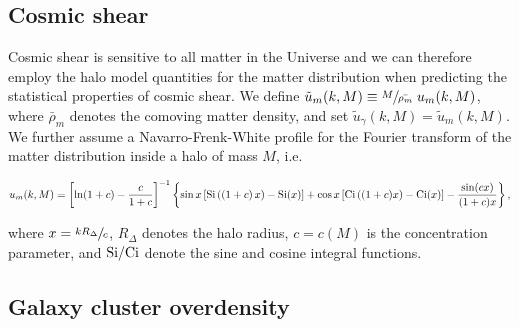 \documentclass[%
 reprint,
nofootinbib,
 amsmath,amssymb,
 aps,
]{revtex4-1}
\begin{document}
\subsection{Cosmic shear}

Cosmic shear is sensitive to all matter in the Universe and we can therefore employ the halo model quantities for the matter distribution when predicting the statistical properties of cosmic shear. We define $\tilde{u}_{m}(k, M) \equiv \sfrac{M}{\bar{\rho_{m}}} \; u_{m}(k, M)$, where $\bar{\rho}_{m}$ denotes the comoving matter density, and set $\tilde{u}_{\gamma}(k, M) = \tilde{u}_{m}(k, M)$. We further assume a Navarro-Frenk-White profile \cite{Navarro:1996} for the Fourier transform of the matter distribution inside a halo of mass $M$, i.e. \cite{Navarro:1996}
\begin{widetext}
\begin{equation}
u_{m}(k, M) = \left[{\rm ln}(1+c)-\frac{c}{1+c}\right]^{-1}  \left\{\sin x\left[{\rm Si}\left((1+c)\,x\right)-{\rm Si}(x)\right]+ \cos x\left[{\rm Ci}\left((1+c)x\right)-{\rm Ci}(x)\right]-\frac{\sin(cx)}{(1+c)x}\right\},
\end{equation}
\end{widetext}
where $x=\sfrac{k R_\Delta}{c}$, $R_\Delta$ denotes the halo radius, $c=c(M)$ is the concentration parameter, and ${\rm Si}/{\rm Ci}$ denote the sine and cosine integral functions.

\subsection{Galaxy cluster overdensity}
\end{document}
